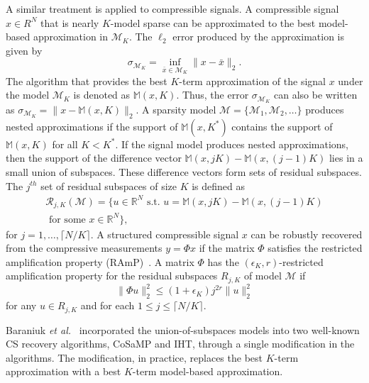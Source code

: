 \documentclass[journal]{IEEEtran}
\begin{document}
A similar treatment is applied to compressible signals. A compressible signal $x \in R^N$ that is nearly $K$-model sparse can be approximated to the best model-based approximation in $\mathcal{M}_K$. The $\ell_2$ error produced by the approximation is given by
\begin{equation}
    \sigma_{\mathcal{M}_K}=\inf_{\bar{x}\in\mathcal{M}_K} \|x-\bar{x}\|_2.
\end{equation}
The algorithm that provides the best $K$-term approximation of the signal $x$ under the model $\mathcal{M}_K$ is denoted as $\mathbb{M}(x,K)$. Thus, the error $\sigma_{\mathcal{M}_K}$ can also be written as $\sigma_{\mathcal{M}_K}= \|x-\mathbb{M}(x,K)\|_2$.
A sparsity model $\mathcal{M}=\{\mathcal{M}_1, \mathcal{M}_2, \ldots\}$ produces nested approximations if the support of $\mathbb{M}(x,K^\ast)$ contains the support of $\mathbb{M}(x,K)$ for all $K<K^\ast$. If the signal model produces nested approximations, then the support of the difference vector $\mathbb{M}(x,jK)-\mathbb{M}(x,(j-1)K)$ lies in a small union of subspaces. These difference vectors form sets of residual subspaces. The $j^{th}$ set of residual subspaces of size $K$ is defined as
\begin{equation}
\begin{split}
\mathcal{R}_{j,K}(\mathcal{M})=\{u\in\mathbb{R}^N \text{ s.t. } u=\mathbb{M}(x,jK)-\mathbb{M}(x,(j-1)K)\\
\text{ for some $x\in\mathbb{R}^N$}\},
\end{split}
\end{equation}
for $j=1, \ldots, \lceil N/K\rceil.$
A structured compressible signal $x$ can be robustly recovered from the compressive measurements $y=\Phi x$ if the matrix $\Phi$ satisfies the restricted amplification property (RAmP)~\cite{Bara10}. A matrix $\Phi$ has the $(\epsilon_K,r)$-restricted amplification property for the residual subspaces $R_{j,K}$ of model $\mathcal{M}$ if
\begin{equation}
\|\Phi u\|_2^2\leq(1+\epsilon_K)j^{2r}\|u\|_2^2
\end{equation}
for any $u \in R_{j,K}$ and for each $1\leq j \leq \lceil N/K\rceil$.

Baraniuk \textit{et al.}~\cite{Bara10} incorporated the union-of-subspaces models into two well-known CS recovery algorithms, CoSaMP and IHT, through a single modification in the algorithms. The modification, in practice, replaces the best $K$-term approximation with a best $K$-term model-based approximation.
\end{document}
